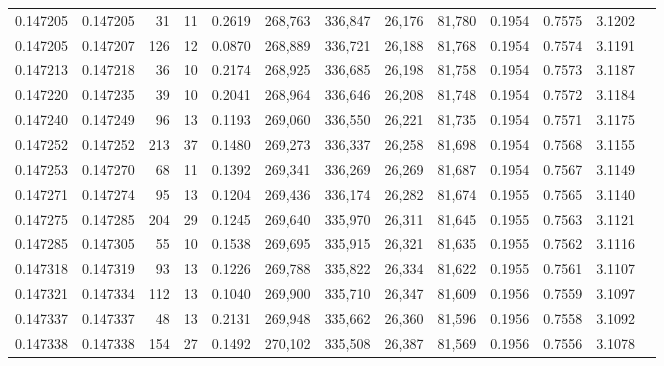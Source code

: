 \begin{tabular}{rrrrrrrrrrrrr}
0.147205 & 0.147205 &    31 &  11 &                                     0.2619 & 268,763 & 336,847 &  26,176 &  81,780 & 0.1954 & 0.7575 & 3.1202 \\
0.147205 & 0.147207 &   126 &  12 &                                     0.0870 & 268,889 & 336,721 &  26,188 &  81,768 & 0.1954 & 0.7574 & 3.1191 \\
0.147213 & 0.147218 &    36 &  10 &                                     0.2174 & 268,925 & 336,685 &  26,198 &  81,758 & 0.1954 & 0.7573 & 3.1187 \\
0.147220 & 0.147235 &    39 &  10 &                                     0.2041 & 268,964 & 336,646 &  26,208 &  81,748 & 0.1954 & 0.7572 & 3.1184 \\
0.147240 & 0.147249 &    96 &  13 &                                     0.1193 & 269,060 & 336,550 &  26,221 &  81,735 & 0.1954 & 0.7571 & 3.1175 \\
0.147252 & 0.147252 &   213 &  37 &                                     0.1480 & 269,273 & 336,337 &  26,258 &  81,698 & 0.1954 & 0.7568 & 3.1155 \\
0.147253 & 0.147270 &    68 &  11 &                                     0.1392 & 269,341 & 336,269 &  26,269 &  81,687 & 0.1954 & 0.7567 & 3.1149 \\
0.147271 & 0.147274 &    95 &  13 &                                     0.1204 & 269,436 & 336,174 &  26,282 &  81,674 & 0.1955 & 0.7565 & 3.1140 \\
0.147275 & 0.147285 &   204 &  29 &                                     0.1245 & 269,640 & 335,970 &  26,311 &  81,645 & 0.1955 & 0.7563 & 3.1121 \\
0.147285 & 0.147305 &    55 &  10 &                                     0.1538 & 269,695 & 335,915 &  26,321 &  81,635 & 0.1955 & 0.7562 & 3.1116 \\
0.147318 & 0.147319 &    93 &  13 &                                     0.1226 & 269,788 & 335,822 &  26,334 &  81,622 & 0.1955 & 0.7561 & 3.1107 \\
0.147321 & 0.147334 &   112 &  13 &                                     0.1040 & 269,900 & 335,710 &  26,347 &  81,609 & 0.1956 & 0.7559 & 3.1097 \\
0.147337 & 0.147337 &    48 &  13 &                                     0.2131 & 269,948 & 335,662 &  26,360 &  81,596 & 0.1956 & 0.7558 & 3.1092 \\
0.147338 & 0.147338 &   154 &  27 &                                     0.1492 & 270,102 & 335,508 &  26,387 &  81,569 & 0.1956 & 0.7556 & 3.1078 \\

\end{tabular}
